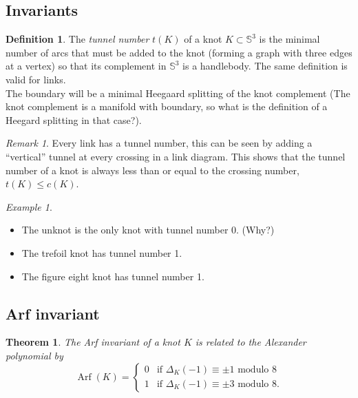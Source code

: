 \documentclass{tufte-book} %
\newtheorem{theorem}{Theorem}
\theoremstyle{definition}
\newtheorem{definition}{Definition}
\theoremstyle{remark}
\newtheorem{remark}{Remark}
\newtheorem{example}{Example}
\DeclareMathOperator{\Arf}{Arf}
\newcommand{\sphere}[1]{\mathbb{S}^{#1}}
\begin{document}
\subsection{Invariants}

\begin{definition}
	The \textit{tunnel number} $t(K)$ of a knot $K \subset \sphere{3}$ is the minimal number of arcs
	that must be added to the knot (forming a graph with three edges at a vertex) so that
	its complement in $\sphere{3}$ is a handlebody. The same definition is
	valid for links. \\
	The boundary will be a minimal Heegaard splitting of the knot complement
	(The knot complement is a manifold with boundary, so what is the definition
	of a Heegard splitting in that case?).
\end{definition}

\begin{remark}
	Every link has a tunnel number, this can be seen by adding a ``vertical''
	tunnel at every crossing in a link diagram.
	This shows that the tunnel number of a knot is always less than or equal
	to the crossing number, $t(K) \le c(K)$.
\end{remark}

\begin{example}
	\begin{itemize}
		\item The unknot is the only knot with tunnel number 0. (Why?)
		\item The trefoil knot has tunnel number 1.
		\item The figure eight knot has tunnel number 1.
	\end{itemize}
\end{example}

\subsection{Arf invariant}

\begin{theorem}
	The Arf invariant of a knot $K$ is related to the Alexander polynomial by
	\begin{equation*}
		\Arf(K) =
		\begin{cases}
			0 & \textrm{if } \Delta_{K}(-1) \equiv \pm 1 \textrm{ modulo } 8 \\
			1 & \textrm{if } \Delta_{K}(-1) \equiv \pm 3 \textrm{ modulo } 8.
		\end{cases}
	\end{equation*}
\end{theorem}
\end{document}
